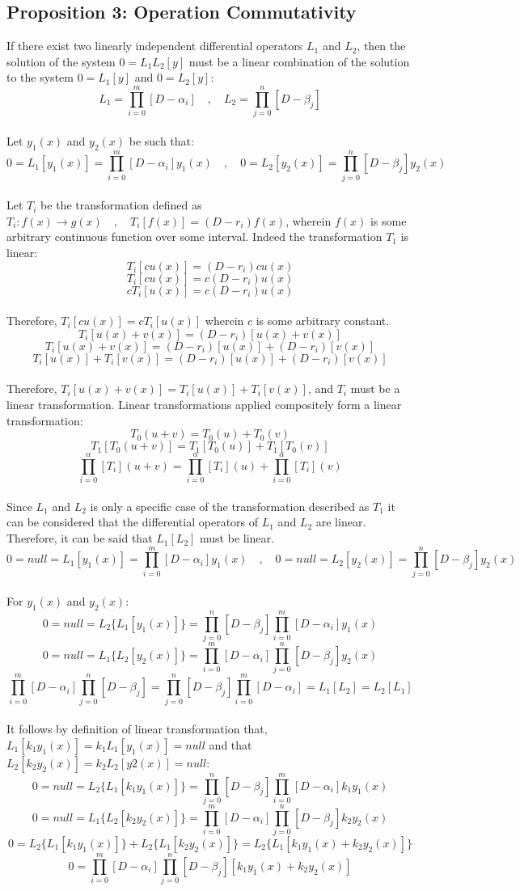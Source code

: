 \documentclass[a4paper, 12pt]{report}
\def\a{\alpha}
\def\be{\beta}
\def\l{\left}
\def\r{\right}
\begin{document}
\begin{center}
\subsection{Proposition 3: Operation Commutativity}
If there exist two linearly independent differential operators $L_1$ and $L_2$, then the solution of the system $0 = L_1L_2[y]$ must be a linear combination of the solution to the system $0 = L_1[y]$ and $0 = L_2[y]$:
$$L_1=\prod_{i = 0}^{m}\l[D - \alpha_{i}\r] \quad,\quad L_2=\prod_{j = 0}^{n}\l[D - \be_{j}\r]$$
\\Let $y_1(x)$ and $y_2(x)$ be such that:
$$0 = L_1[y_1(x)]=\prod_{i = 0}^{m}\l[D - \alpha_{i}\r]y_1(x) \quad,\quad 0 = L_2[y_2(x)]=\prod_{j = 0}^{n}\l[D - \be_{j}\r]y_2(x)$$
\\Let $T_i$ be the transformation defined as $T_i: f(x) \to g(x)\quad , \quad T_i[f(x)] = (D - r_i)f(x) $, wherein $f(x)$ is some arbitrary continuous function over some interval. Indeed the transformation $T_1$ is linear:
$$T_i[cu(x)] = (D - r_i)cu(x)$$ 
$$T_i[cu(x)] = c(D - r_i)u(x)$$
$$cT_i[u(x)] = c(D - r_i)u(x)$$
\\Therefore, $T_i[cu(x)] = cT_i[u(x)]$ wherein $c$ is some arbitrary constant.
$$T_i[u(x) + v(x)] = (D - r_i)[u(x) + v(x)]$$
$$T_i[u(x) + v(x)] = (D - r_i)[u(x)] + (D - r_i)[v(x)]$$
$$T_i[u(x)] + T_i[v(x)] = (D - r_i)[u(x)] + (D - r_i)[v(x)]$$
\\Therefore, $T_i[u(x) +v(x)] = T_i[u(x)] + T_i[v(x)]$, and $T_i$ must be a linear transformation. Linear transformations applied compositely form a linear transformation:
$$T_0(u + v) = T_0(u) + T_0(v)$$
$$T_1[T_0(u + v)] = T_1[T_0(u)] + T_1[T_0(v)]$$
$$\prod_{i = 0}^{\a}\l[T_i\r](u + v) = \prod_{i = 0}^{\a}\l[T_i\r](u) + \prod_{i = 0}^{\a}\l[T_i\r](v)$$
\\Since $L_1$ and $L_2$ is only a specific case of the transformation described as $T_1$ it can be considered that the differential operators of $L_1$ and $L_2$ are linear. Therefore, it can be said that $L_1[L_2]$ must be linear. 
$$0 =null = L_1[y_1(x)]=\prod_{i = 0}^{m}\l[D - \alpha_{i}\r]y_1(x)\quad,\quad 0 = null = L_2[y_2(x)]=\prod_{j = 0}^{n}\l[D - \be_{j}\r]y_2(x)$$
\\For $y_1(x)$ and $y_2(x)$:
$$0 =null = L_2\{L_1[y_1(x)]\}=\prod_{j = 0}^{n}\l[D - \be_{j}\r]\prod_{i = 0}^{m}\l[D - \alpha_{i}\r]y_1(x)$$
$$0 = null = L_1\{L_2[y_2(x)]\} = \prod_{i = 0}^{m}\l[D - \alpha_{i}\r]\prod_{j = 0}^{n}\l[D - \be_{j}\r]y_2(x)$$
$$\prod_{i = 0}^{m}\l[D - \alpha_{i}\r]\prod_{j = 0}^{n}\l[D - \be_{j}\r] = \prod_{j = 0}^{n}\l[D - \be_{j}\r]\prod_{i = 0}^{m}\l[D - \alpha_{i}\r] = L_1[L_2] = L_2[L_1]$$
\\It follows by definition of linear transformation that, $L_1[k_1y_1(x)] = k_1L_1[y_1(x)] = null$ and that $L_2[k_2y_2(x)] = k_2L_2[y2(x)] = null$:
$$0 =null = L_2\{L_1[k_1y_1(x)]\}=\prod_{j = 0}^{n}\l[D - \be_{j}\r]\prod_{i = 0}^{m}\l[D - \alpha_{i}\r]k_1y_1(x)$$
$$0 = null = L_1\{L_2[k_2y_2(x)]\} = \prod_{i = 0}^{m}\l[D - \alpha_{i}\r]\prod_{j = 0}^{n}\l[D - \be_{j}\r]k_2y_2(x)$$
$$0 = L_2\{L_1[k_1y_1(x)]\} + L_2\{L_1[k_2y_2(x)]\} = L_2\{L_1[k_1y_1(x) + k_2y_2(x)]\}$$
$$0  = \prod_{i = 0}^{m}\l[D - \alpha_{i}\r]\prod_{j = 0}^{n}\l[D - \be_{j}\r][k_1y_1(x) + k_2y_2(x)]$$

\end{center}
\end{document}
